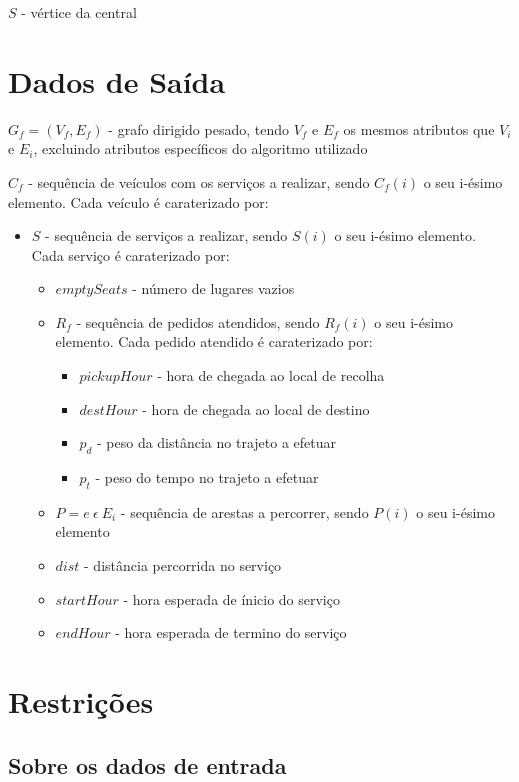 \documentclass[article, a4paper, 12pt, oneside]{memoir}
\begin{document}
$S$ - vértice da central

\section{Dados de Saída}

$G_f = (V_f, E_f)$ - grafo dirigido pesado, tendo $V_f$ e $E_f$ os mesmos atributos que $V_i$ e $E_i$, excluindo atributos específicos do algoritmo utilizado

$C_f$ - sequência de veículos com os serviços a realizar, sendo $C_f(i)$ o seu i-ésimo elemento. Cada veículo é caraterizado por:
\begin{itemize}
	\item $S$ - sequência de serviços a realizar, sendo $S(i)$ o seu i-ésimo elemento. Cada serviço é caraterizado por:
	\begin{itemize}
		\item $emptySeats$ - número de lugares vazios
		\item $R_f$ - sequência de pedidos atendidos, sendo $R_f(i)$ o seu i-ésimo elemento. Cada pedido atendido é caraterizado por:
		\begin{itemize}
			\item $pickupHour$ - hora de chegada ao local de recolha
			\item $destHour$ - hora de chegada ao local de destino
			\item $p_d$ - peso da distância no trajeto a efetuar
			\item $p_t$ - peso do tempo no trajeto a efetuar
		\end{itemize}
		\item $P = { e ~ \epsilon ~ E_i }$ - sequência de arestas a percorrer, sendo $P(i)$ o seu i-ésimo elemento
		\item $dist$ - distância percorrida no serviço
		\item $startHour$ - hora esperada de ínicio do serviço
		\item $endHour$ - hora esperada de termino do serviço
	\end{itemize}
\end{itemize}

\section{Restrições}

\subsection{Sobre os dados de entrada}
\end{document}

